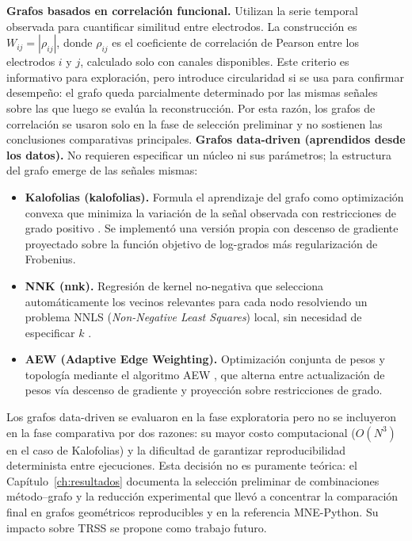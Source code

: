 \textbf{Grafos basados en correlación funcional.} Utilizan la serie temporal observada para cuantificar similitud entre electrodos. La construcción es $W_{ij} = |\rho_{ij}|$, donde $\rho_{ij}$ es el coeficiente de correlación de Pearson entre los electrodos $i$ y $j$, calculado solo con canales disponibles. Este criterio es informativo para exploración, pero introduce circularidad si se usa para confirmar desempeño: el grafo queda parcialmente determinado por las mismas señales sobre las que luego se evalúa la reconstrucción. Por esta razón, los grafos de correlación se usaron solo en la fase de selección preliminar y no sostienen las conclusiones comparativas principales.
\textbf{Grafos data-driven (aprendidos desde los datos).} No requieren especificar un núcleo ni sus parámetros; la estructura del grafo emerge de las señales mismas:
\begin{itemize}[leftmargin=*,itemsep=1pt,topsep=2pt]
\item \textbf{Kalofolias (kalofolias).} Formula el aprendizaje del grafo como optimización convexa que minimiza la variación de la señal observada con restricciones de grado positivo \cite{kalofolias_how_2016}. Se implementó una versión propia con descenso de gradiente proyectado sobre la función objetivo de log-grados más regularización de Frobenius.
\item \textbf{NNK (nnk).} Regresión de kernel no-negativa que selecciona automáticamente los vecinos relevantes para cada nodo resolviendo un problema NNLS (\textit{Non-Negative Least Squares}) local, sin necesidad de especificar $k$ \cite{shekkizhar2020}.
\item \textbf{AEW (Adaptive Edge Weighting).} Optimización conjunta de pesos y topología mediante el algoritmo AEW \cite{shekkizhar2020}, que alterna entre actualización de pesos vía descenso de gradiente y proyección sobre restricciones de grado.
\end{itemize}
Los grafos data-driven se evaluaron en la fase exploratoria pero no se incluyeron en la fase comparativa por dos razones: su mayor costo computacional ($O(N^3)$ en el caso de Kalofolias) y la dificultad de garantizar reproducibilidad determinista entre ejecuciones. Esta decisión no es puramente teórica: el Capítulo~\ref{ch:resultados} documenta la selección preliminar de combinaciones método--grafo y la reducción experimental que llevó a concentrar la comparación final en grafos geométricos reproducibles y en la referencia MNE-Python. Su impacto sobre TRSS se propone como trabajo futuro.

